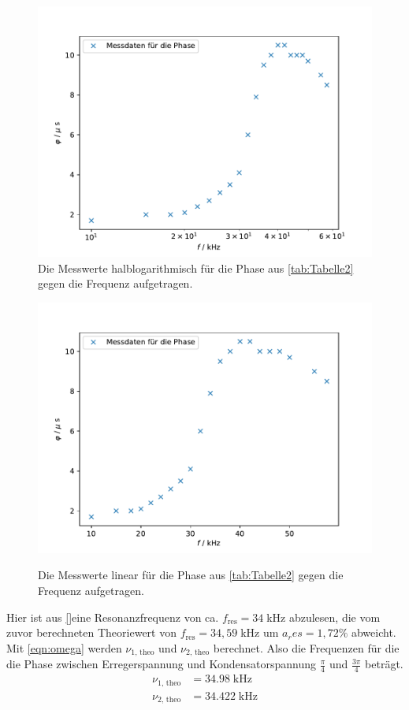 \documentclass[titlepage = firstcover]{scrartcl}
\begin{document}
            \begin{figure}[h]
                \centering
                \caption{Die Messwerte halblogarithmisch für die Phase aus \ref{tab:Tabelle2} gegen die Frequenz aufgetragen.}
                \includegraphics[width = 0.7\linewidth]{Phase_log.pdf}
            \end{figure}
            \FloatBarrier
            \begin{figure}[h]
                \centering
                \caption{Die Messwerte linear für die Phase aus \ref{tab:Tabelle2} gegen die Frequenz aufgetragen.}
                \includegraphics[width = 0.7\linewidth]{Phase.pdf}
                \label{fig:phase}
            \end{figure}
            \FloatBarrier
            \noindent
            Hier ist aus \ref{}eine Resonanzfrequenz von ca. $f_\text{res} = 34 \;$kHz abzulesen, die vom zuvor berechneten Theoriewert von
            $f_\text{res} = 34,59 \;$kHz um $a_res = 1,72 \%$ abweicht.
            Mit \eqref{eqn:omega} werden $\nu_\text{1, theo}$ und $\nu_\text{2, theo}$ berechnet. Also die Frequenzen für die die Phase zwischen
            Erregerspannung und Kondensatorspannung $\frac{\pi}{4}$ und $\frac{3\pi}{4}$ beträgt.
            \begin{align}
                \nu_\text{1, theo} &= 34.98 \; \text{kHz} \\
                \nu_\text{2, theo} &= 34.422 \; \text{kHz}
            \end{align}
\end{document}
